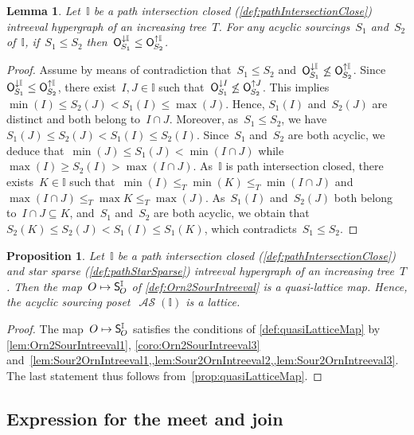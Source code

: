 \documentclass{amsart}
\newtheorem{proposition}[theorem]{Proposition}
\newtheorem{lemma}[theorem]{Lemma}
\theoremstyle{definition}
\newcommand{\mymap}[2]{\mathsf{#1}_{\hspace{-.7pt}#2}}
\newcommand{\minorn}[2]{\mymap{O}{#1}^{\downarrow#2}}  %
\newcommand{\maxorn}[2]{\mymap{O}{#1}^{\uparrow#2}}  %
\newcommand{\sour}[1]{\mymap{S}{#1}}  %
\DeclareMathOperator{\ASour}{\mathcal{AS}}  %
\newcommand{\II}{\mathbb I} %
\begin{document}
\begin{lemma}
\label{lem:Sour2OrnIntreeval3}
Let~$\II$ be a path intersection closed (\cref{def:pathIntersectionClose}) intreeval hypergraph of an increasing tree~$T$.
For any acyclic sourcings~$S_1$ and~$S_2$ of~$\II$, if~$S_1 \le S_2$ then~$\minorn{S_1}{\II} \le \maxorn{S_2}{\II}$.
\end{lemma}

\begin{proof}
Assume by means of contradiction that~$S_1 \le S_2$ and~$\minorn{S_1}{\II} \not\le \maxorn{S_2}{\II}$.
Since~$\minorn{S_1}{\II} \le \maxorn{S_2}{\II}$, there exist~$I, J \in \II$ such that~$\minorn{S_1}{I} \not\le \maxorn{S_2}{J}$.
This implies~$\min(I) \le S_2(J) < S_1(I) \le \max(J)$.
Hence, $S_1(I)$ and~$S_2(J)$ are distinct and both belong to~$I \cap J$.
Moreover, as~$S_1 \le S_2$, we have~$S_1(J) \le S_2(J) < S_1(I) \le S_2(I)$.
Since~$S_1$ and~$S_2$ are both acyclic, we deduce that~$\min(J) \le S_1(J) < \min(I \cap J)$ while~$\max(I) \ge S_2(I) > \max(I \cap J)$.
As~$\II$ is path intersection closed, there exists~$K \in \II$ such that~$\min(I) \le_T \min(K) \le_T \min(I\cap J)$ and $\max(I\cap J) \le_T \max K \le_T \max(J)$.
As~$S_1(I)$ and~$S_2(J)$ both belong to~$I \cap J \subseteq K$, and~$S_1$ and~$S_2$ are both acyclic, we obtain that~$S_2(K) \le S_2(J) < S_1(I) \le S_1(K)$, which contradicts~$S_1 \le S_2$.
\end{proof}

\begin{proposition}
\label{prop:quasiLatticeMapIntreevalLattices}
Let~$\II$ be a path intersection closed (\cref{def:pathIntersectionClose}) and star sparse (\cref{def:pathStarSparse}) intreeval hypergraph of an increasing tree~$T$.
Then the map~$O \mapsto \sour{O}^\II$ of \cref{def:Orn2SourIntreeval} is a quasi-lattice map.
Hence, the acyclic sourcing poset~$\ASour(\II)$ is a lattice.
\end{proposition}

\begin{proof}
The map~$O \mapsto \sour{O}^\II$ satisfies the conditions of \cref{def:quasiLatticeMap} by \cref{lem:Orn2SourIntreeval1}, \cref{coro:Orn2SourIntreeval3} and~\cref{lem:Sour2OrnIntreeval1,,lem:Sour2OrnIntreeval2,,lem:Sour2OrnIntreeval3}.
The last statement thus follows from~\cref{prop:quasiLatticeMap}.
\end{proof}


\subsection{Expression for the meet and join}
\label{subsec:formulaMeetJoin}
\end{document}
